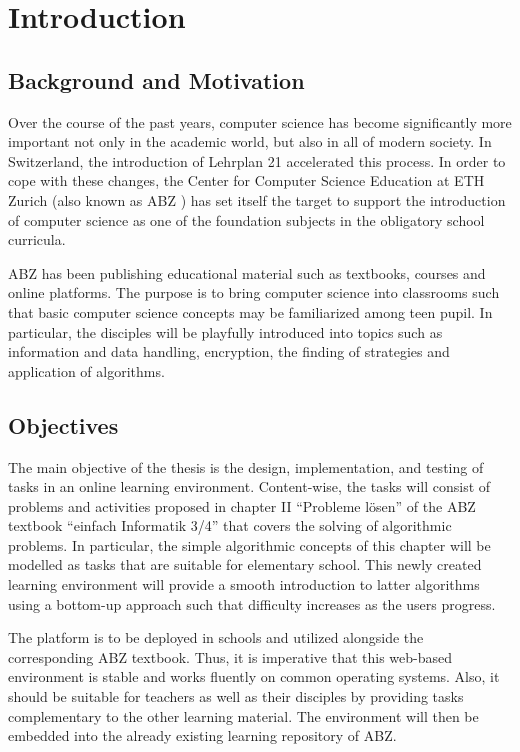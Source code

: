 \chapter{Introduction}

\section{Background and Motivation}

Over the course of the past years, computer science has become significantly more important not only in the academic world, but also in all of modern society. In Switzerland, the introduction of Lehrplan 21 \cite{Lehrplan21} accelerated this process. In order to cope with these changes, the Center for Computer Science Education at ETH Zurich (also known as ABZ \cite{ABZ}) has set itself the target to support the introduction of computer science as one of the foundation subjects in the obligatory school curricula. 

ABZ has been publishing educational material such as textbooks, courses and online platforms. The purpose is to bring computer science into classrooms such that basic computer science concepts may be familiarized among teen pupil. In particular, the disciples will be playfully introduced into topics such as information and data handling, encryption, the finding of strategies and application of algorithms.


\section{Objectives}

The main objective of the thesis is the design, implementation, and testing of tasks in an online learning environment. Content-wise, the tasks will consist of problems and activities proposed in chapter II “Probleme lösen” of the ABZ textbook “einfach Informatik 3/4” that covers the solving of algorithmic problems. In particular, the simple algorithmic concepts of this chapter will be modelled as tasks that are suitable for elementary school. This newly created learning environment will provide a smooth introduction to latter algorithms using a bottom-up approach such that difficulty increases as the users progress.

The platform is to be deployed in schools and utilized alongside the corresponding ABZ textbook. Thus, it is imperative that this web-based environment is stable and works fluently on common operating systems. Also, it should be suitable for teachers as well as their disciples by providing tasks complementary to the other learning material. The environment will then be embedded into the already existing learning repository of ABZ.

